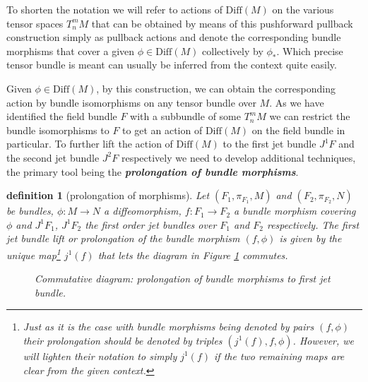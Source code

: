 \documentclass[a4paper,12pt, DIV=14, BCOR=5mm, twoside, headsepline, numbers=noenddot]{scrbook}
\newtheorem{definition}{definition}[section]
\begin{document}
To shorten the notation we will refer to actions of $\mathrm{Diff}(M)$ on the various tensor spaces $T^m_nM$ that can be obtained by means of this pushforward pullback construction simply as pullback actions and denote the corresponding bundle morphisms that cover a given $\phi \in \mathrm{Diff}(M)$ collectively by $\phi_{\ast}$. Which precise tensor bundle is meant can usually be inferred from the context quite easily.

Given $\phi \in \mathrm{Diff}(M)$, by this construction, we can obtain the corresponding action by bundle isomorphisms on any tensor bundle over $M$. As we have identified the field bundle $F$ with a subbundle of some $T^m_nM$ we can restrict the bundle isomorphisms to $F$ to get an action of $\mathrm{Diff}(M)$ on the field bundle in particular. 
To further lift the action of $\mathrm{Diff}(M)$ to the first jet bundle $J^1F$ and the second jet bundle $J^2F$ respectively we need to develop additional techniques, the primary tool being the \textbf{\textit{prolongation of bundle morphisms}}. 
\begin{definition}[prolongation of morphisms]
Let $(F_1,\pi_{F_1},M)$ and $(F_2,\pi_{F_2},N)$ be bundles, $\phi : M \rightarrow N$ a diffeomorphism, $f : F_1 \rightarrow F_2$ a bundle morphism covering $\phi$ and $J^1F_1$, $J^1F_2$ the first order jet bundles over $F_1$ and $F_2$ respectively. The first jet bundle lift or prolongation of the bundle morphism $(f,\phi)$ is given by the unique map\footnote{Just as it is the case with bundle morphisms being denoted by pairs $(f,\phi)$ their prolongation should be denoted by triples $(j^1(f),f,\phi)$. However, we will lighten their notation to simply $j^1(f)$ if the two remaining maps are clear from the given context.} $j^1(f)$ that lets the diagram in Figure \ref{ProlongMorph} commutes.
\begin{figure}[hbt!]
\centering
{}
\caption{Commutative diagram: prolongation of bundle morphisms to first jet bundle.}\label{ProlongMorph}
\end{figure}
\end{definition}
\end{document}
